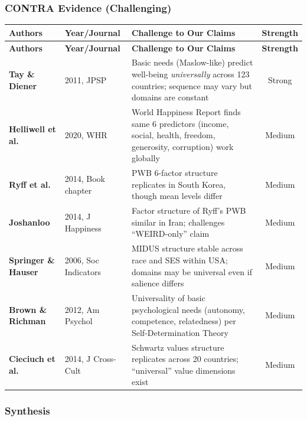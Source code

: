 \subsubsection{CONTRA Evidence (Challenging)}

\begin{center}
\scriptsize
\begin{longtable}{@{}p{3cm}p{2cm}p{6cm}c@{}}
\toprule
\textbf{Authors} & \textbf{Year/Journal} & \textbf{Challenge to Our Claims} & \textbf{Strength} \\
\midrule
\endfirsthead
\toprule
\textbf{Authors} & \textbf{Year/Journal} & \textbf{Challenge to Our Claims} & \textbf{Strength} \\
\midrule
\endhead
\bottomrule
\endlastfoot
\textbf{Tay \& Diener} & 2011, JPSP & Basic needs (Maslow-like) predict well-being \textit{universally} across 123 countries; sequence may vary but domains are constant & Strong \\
\textbf{Helliwell et al.} & 2020, WHR & World Happiness Report finds same 6 predictors (income, social, health, freedom, generosity, corruption) work globally & Medium \\
\textbf{Ryff et al.} & 2014, Book chapter & PWB 6-factor structure replicates in South Korea, though mean levels differ & Medium \\
\textbf{Joshanloo} & 2014, J Happiness & Factor structure of Ryff's PWB similar in Iran; challenges ``WEIRD-only'' claim & Medium \\
\textbf{Springer \& Hauser} & 2006, Soc Indicators & MIDUS structure stable across race and SES within USA; domains may be universal even if salience differs & Medium \\
\textbf{Brown \& Richman} & 2012, Am Psychol & Universality of basic psychological needs (autonomy, competence, relatedness) per Self-Determination Theory & Medium \\
\textbf{Cieciuch et al.} & 2014, J Cross-Cult & Schwartz values structure replicates across 20 countries; ``universal'' value dimensions exist & Medium \\
\end{longtable}
\end{center}

\subsubsection{Synthesis}

